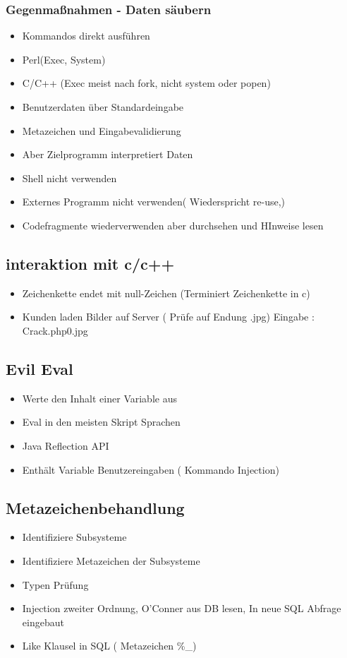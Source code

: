 \subsubsection*{ Gegenmaßnahmen - Daten säubern }
\begin{itemize}
	\item Kommandos direkt ausführen
	\item Perl(Exec, System)
	\item C/C++ (Exec  meist nach fork, nicht system oder popen)
	\item Benutzerdaten über Standardeingabe
	\item Metazeichen und Eingabevalidierung
	\item Aber Zielprogramm interpretiert Daten
	\item Shell nicht verwenden
	\item Externes Programm nicht verwenden( Wiederspricht re-use,)
	\item Codefragmente wiederverwenden aber durchsehen und HInweise lesen
\end{itemize}

\subsection*{ interaktion mit c/c++ }
\begin{itemize}
\item Zeichenkette endet mit null-Zeichen (Terminiert Zeichenkette in c)
\item Kunden laden Bilder auf Server ( Prüfe auf Endung .jpg) Eingabe : Crack.php0.jpg
\end{itemize}

\subsection*{ Evil Eval }
\begin{itemize}
	\item Werte den Inhalt einer Variable aus
	\item Eval in den meisten Skript Sprachen
	\item Java Reflection API
	\item Enthält Variable Benutzereingaben ( Kommando Injection)
\end{itemize}

\subsection*{ Metazeichenbehandlung }
\begin{itemize}
	\item Identifiziere Subsysteme
	\item Identifiziere Metazeichen der Subsysteme
	\item Typen Prüfung
	\item Injection zweiter Ordnung, O'Conner aus DB lesen, In neue SQL Abfrage eingebaut
	\item Like Klausel in SQL ( Metazeichen \%\_)
\end{itemize}


